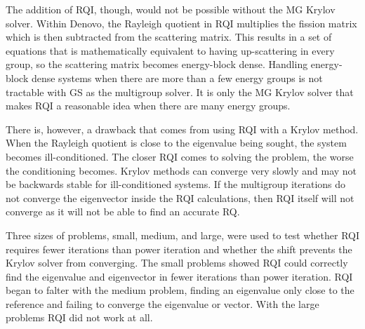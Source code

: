 The addition of RQI, though, would not be possible without the MG Krylov solver. Within Denovo, the Rayleigh quotient in RQI multiplies the fission matrix which is then subtracted from the scattering matrix. This results in a set of equations that is mathematically equivalent to having up-scattering in every group, so the scattering matrix becomes energy-block dense. Handling energy-block dense systems when there are more than a few energy groups is not tractable with GS as the multigroup solver. It is only the MG Krylov solver that makes RQI a reasonable idea when there are many energy groups.


There is, however, a drawback that comes from using RQI with a Krylov method. When the Rayleigh quotient is close to the eigenvalue being sought, the system becomes ill-conditioned. The closer RQI comes to solving the problem, the worse the conditioning becomes. Krylov methods can converge very slowly and may not be backwards stable for ill-conditioned systems. If the multigroup iterations do not converge the eigenvector inside the RQI calculations, then RQI itself will not converge as it will not be able to find an accurate RQ.

Three sizes of problems, small, medium, and large, were used to test whether RQI requires fewer iterations than power iteration and whether the shift prevents the Krylov solver from converging. The small problems showed RQI could correctly find the eigenvalue and eigenvector in fewer iterations than power iteration. RQI began to falter with the medium problem, finding an eigenvalue only close to the reference and failing to converge the eigenvalue or vector. With the large problems RQI did not work at all.



